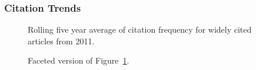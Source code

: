 \documentclass[
  10pt,
  letterpaper,
  DIV=11,
  numbers=noendperiod,
  twoside]{scrartcl}
\begin{document}
\subsubsection*{Citation Trends}\label{sec-trends-2011}

\begin{figure}


\caption{\label{fig-citation-spaghetti-2011}Rolling five year average of
citation frequency for widely cited articles from 2011.}

\end{figure}%

\begin{figure}


\caption{\label{fig-citation-facet-2011}Faceted version of
Figure~\ref{fig-citation-spaghetti-2011}.}

\end{figure}%
\end{document}

